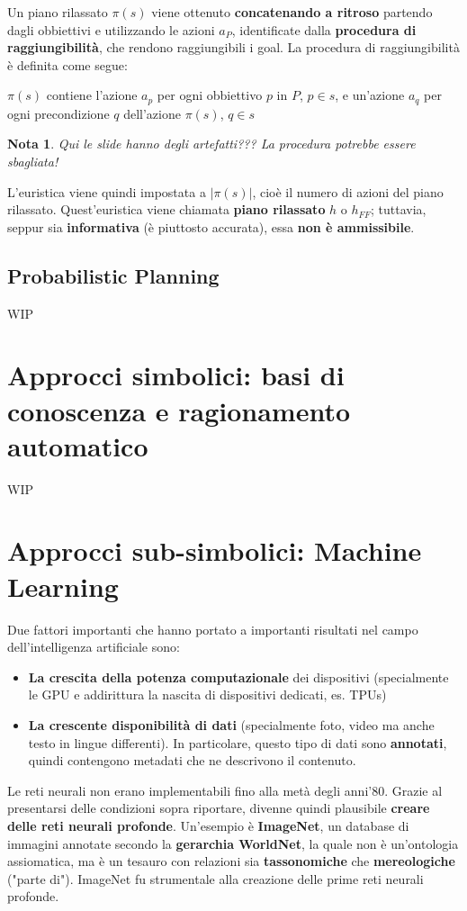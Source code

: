 \documentclass[12pt]{article}
\newtheorem{Nota}{Nota}[subsection]
\begin{document}
Un piano rilassato $\pi(s)$ viene ottenuto \textbf{concatenando a ritroso} partendo dagli obbiettivi e utilizzando le azioni $a_P$, identificate dalla \textbf{procedura di raggiungibilità}, che rendono raggiungibili i goal.
La procedura di raggiungibilità è definita come segue:
\begin{center}
    $\pi(s)$ contiene l'azione $a_p$ per ogni obbiettivo $p$ in $P$, $p \in s$, e un'azione $a_q$ per ogni precondizione $q$ dell'azione $\pi(s)$, $q \in s$
\end{center}
\begin{Nota}
    Qui le slide hanno degli artefatti??? La procedura potrebbe essere sbagliata!
\end{Nota}
L'euristica viene quindi impostata a $|\pi(s)|$, cioè il numero di azioni del piano rilassato.
Quest'euristica viene chiamata \textbf{piano rilassato} $h$ o $h_{FF}$; tuttavia, seppur sia \textbf{informativa} (è piuttosto accurata), essa \textbf{non è ammissibile}.
\subsection{Probabilistic Planning}
WIP
\section{Approcci simbolici: basi di conoscenza e ragionamento automatico}
WIP
\section{Approcci sub-simbolici: Machine Learning}
Due fattori importanti che hanno portato a importanti risultati nel campo dell'intelligenza artificiale sono:
\begin{itemize}
    \item \textbf{La crescita della potenza computazionale} dei dispositivi (specialmente le GPU e addirittura la nascita di dispositivi dedicati, es. TPUs)
    \item \textbf{La crescente disponibilità di dati} (specialmente foto, video ma anche testo in lingue differenti). In particolare, questo tipo di dati sono \textbf{annotati}, quindi contengono metadati che ne descrivono il contenuto.
\end{itemize} 
Le reti neurali non erano implementabili fino alla metà degli anni'80. Grazie al presentarsi delle condizioni sopra riportare, divenne quindi plausibile
\textbf{creare delle reti neurali profonde}. Un'esempio è \textbf{ImageNet}, un database di immagini annotate secondo la \textbf{gerarchia WorldNet}, la quale non è un'ontologia assiomatica, ma è un tesauro con relazioni sia \textbf{tassonomiche} che
\textbf{mereologiche} ("parte di"). ImageNet fu strumentale alla creazione delle prime reti neurali profonde.
\end{document}
